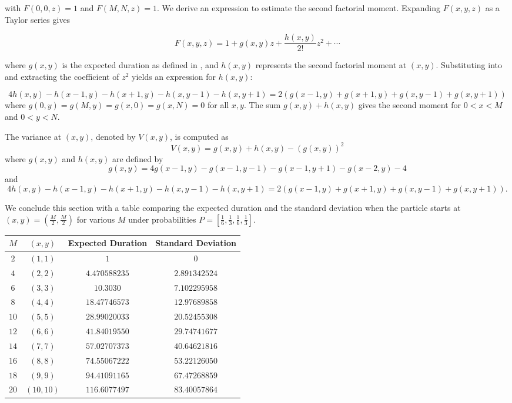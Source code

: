 \documentclass[reqno]{amsart}
\theoremstyle{definition}
\theoremstyle{definition}
\theoremstyle{remark}
\begin{document}
with $F(0,0,z)=1$ and $F(M,N,z)=1$. We derive an expression to estimate the second factorial moment. Expanding $F(x,y,z)$ as a Taylor series gives

\begin{equation}\label{eq:taylor in 2d}
    F(x,y,z)=1+g(x,y)z+\frac{h(x,y)}{2!}z^2 +\cdots
\end{equation}

where $g(x,y)$ is the expected duration as defined in , and $h(x,y)$ represents the second factorial moment at $(x,y)$. Substituting  into  and extracting the coefficient of $z^2$ yields an expression for $h(x,y)$:


\[4h(x,y)-h(x-1,y)-h(x+1,y)-h(x,y-1)-h(x,y+1)=2(g(x-1,y)+g(x+1,y)+g(x,y-1)+g(x,y+1))\]
where $g(0,y)=g(M,y)=g(x,0)=g(x,N)=0$ for all $x,y$. The sum $g(x,y)+h(x,y)$ gives the second moment for $0<x<M$ and $0<y<N$. 

The variance at $(x,y)$, denoted by $V(x,y)$, is computed as
\[ V(x,y)=g(x,y)+h(x,y)-(g(x,y))^2\]
where $g(x,y)$ and $h(x,y)$ are defined by
\[g(x,y)=4g(x-1,y)-g(x-1,y-1)-g(x-1,y+1)-g(x-2,y)-4\]
and
\[
    4h(x,y)-h(x-1,y)-h(x+1,y)-h(x,y-1)-h(x,y+1)=2(g(x-1,y)+g(x+1,y)+g(x,y-1)+g(x,y+1)).\]


We conclude this section with a table comparing the expected duration and the standard deviation when the particle starts at $(x,y)=(\frac{M}{2},\frac{M}{2})$ for various $M$ under probabilities $P=[\frac{1}{6},\frac{1}{3},\frac{1}{6},\frac{1}{3}]$.



\begin{table}[H]
\centering
\begin{tabular}{|c|c|c|c|}
\hline
$M$ & $(x,y)$ & Expected Duration& Standard Deviation \\
\hline
$2$ & $(1,1)$ & $1$ & $0$\\\hline
$4$ & $(2,2)$ & $4.470588235$ & $ 2.891342524$\\ \hline
$6$ & $(3,3)$ & $10.3030$ & $7.102295958$\\ \hline
$8$ & $(4,4)$ & $18.47746573 $ & $12.97689858$ \\ \hline
$10$ & $(5,5)$ & $28.99020033 $ & $20.52455308$\\ \hline
$12$ & $(6,6)$ & $ 41.84019550$ & $29.74741677$\\ \hline
$14$ & $(7,7)$ & $ 57.02707373$ & $40.64621816$\\ \hline
$16$ & $(8,8)$ & $ 74.55067222$ & $53.22126050$\\ \hline
$18$ & $(9,9)$ & $94.41091165 $ & $67.47268859$\\ \hline
$20$ & $(10,10)$ & $116.6077497 $ & $83.40057864$ \\ \hline
\end{tabular}
\end{table}
\end{document}
